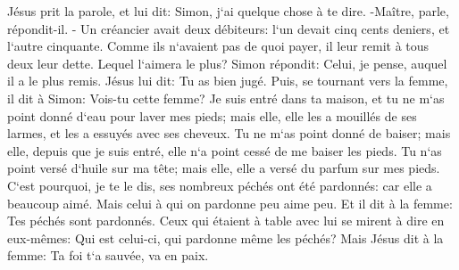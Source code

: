 \verse Jésus prit la parole, et lui dit: Simon, j`ai quelque chose à te dire. -Maître, parle, répondit-il. - 
\verse Un créancier avait deux débiteurs: l`un devait cinq cents deniers, et l`autre cinquante. 
\verse Comme ils n`avaient pas de quoi payer, il leur remit à tous deux leur dette. Lequel l`aimera le plus? 
\verse Simon répondit: Celui, je pense, auquel il a le plus remis. Jésus lui dit: Tu as bien jugé. 
\verse Puis, se tournant vers la femme, il dit à Simon: Vois-tu cette femme? Je suis entré dans ta maison, et tu ne m`as point donné d`eau pour laver mes pieds; mais elle, elle les a mouillés de ses larmes, et les a essuyés avec ses cheveux. 
\verse Tu ne m`as point donné de baiser; mais elle, depuis que je suis entré, elle n`a point cessé de me baiser les pieds. 
\verse Tu n`as point versé d`huile sur ma tête; mais elle, elle a versé du parfum sur mes pieds. 
\verse C`est pourquoi, je te le dis, ses nombreux péchés ont été pardonnés: car elle a beaucoup aimé. Mais celui à qui on pardonne peu aime peu. 
\verse Et il dit à la femme: Tes péchés sont pardonnés. 
\verse Ceux qui étaient à table avec lui se mirent à dire en eux-mêmes: Qui est celui-ci, qui pardonne même les péchés? 
\verse Mais Jésus dit à la femme: Ta foi t`a sauvée, va en paix. 

\chapter{}

